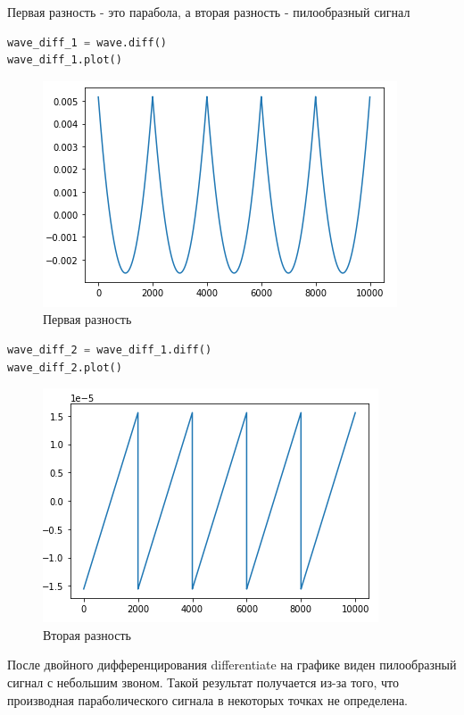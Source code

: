 Первая разность - это парабола, а вторая разность - пилообразный сигнал

\begin{lstlisting}[language=Python]
wave_diff_1 = wave.diff()
wave_diff_1.plot()
\end{lstlisting}

\begin{figure}[H]
	\begin{center}
		\includegraphics[scale=1]{fig/lab09/lab09_13.png}
		\caption{Первая разность}
	\end{center}
\end{figure}

\begin{lstlisting}[language=Python]
wave_diff_2 = wave_diff_1.diff()
wave_diff_2.plot()
\end{lstlisting}

\begin{figure}[H]
	\begin{center}
		\includegraphics[scale=1]{fig/lab09/lab09_14.png}
		\caption{Вторая разность}
	\end{center}
\end{figure}

После двойного дифференцирования differentiate на графике виден пилообразный сигнал с небольшим звоном. Такой результат получается из-за того, что производная параболического сигнала в некоторых точках не определена.

